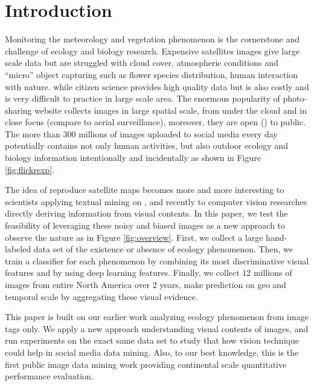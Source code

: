 \documentclass[10pt]{article}
\begin{document}
\section{Introduction}

Monitoring the meteorology and vegetation phenomenon is the cornerstone and challenge of ecology and biology research. Expensive satellites images give large scale data but are struggled with cloud cover, 
atmospheric conditions and ``micro'' object capturing such as flower species distribution, human interaction with nature.
while citizen science provides high quality data but is also costly and is very difficult to practice in large scale area. 
The enormous popularity of photo-sharing website collects images in large spatial scale, from under the cloud and in close focus (compare to aerial surveillance), 
moreover, they are open () to public.
The more than 300 millions of images uploaded to social media every day
\cite{https://zephoria.com/top-15-valuable-facebook-statistics/}
 potentially contains not only human activities, but also outdoor ecology and biology information intentionally and incidentally as shown in Figure \ref{fig:flickrexp}.

The idea of reproduce satellite maps becomes more and more interesting to scientists applying textual mining on , 
and recently to computer vision researches directly deriving  information from visual contents.
In this paper, we test the feasibility of leveraging these noisy and biased images as a new approach to observe the nature as in Figure \ref{fig:overview}. 
First, we collect a large hand-labeled data set of the existence or absence of ecology phenomenon. 
Then, we train a classifier for each phenomenon by combining its most discriminative visual features and by using deep learning features. 
Finally, we collect 12 millions of images from entire North America over 2 years, make prediction on geo and temporal scale by aggregating these visual evidence.

This paper is built on our earlier work  analyzing ecology phenomenon from image tags only. We apply a new approach understanding visual contents of images, and run experiments on the exact same data set to study that how vision technique could help in social media data mining. Also, to our best knowledge, this is the first public image data mining work providing continental scale quantitative performance evaluation.
\end{document}
